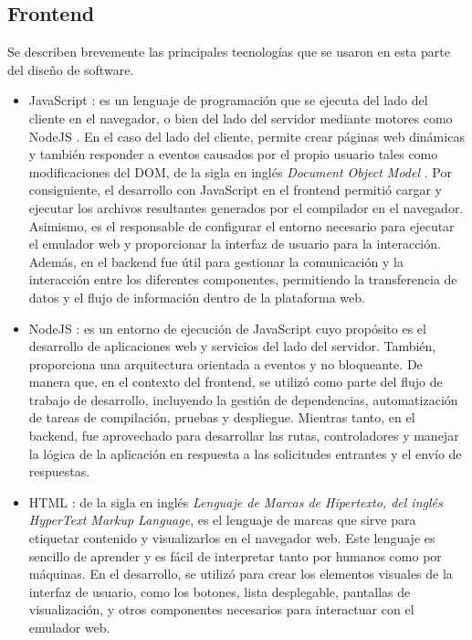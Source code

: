\hfill \break
\hfill \break
\hfill \break
\hfill \break

\subsection{Frontend}
\label{subsec:Frontend}

Se describen brevemente las principales tecnologías que se usaron en esta parte del diseño de software.

\begin{itemize}
	\item JavaScript \citep{JavaScript}: es un lenguaje de programación que se ejecuta del lado del cliente en el navegador, o bien del lado del servidor mediante motores como NodeJS \citep{NodeJS}. En el caso del lado del cliente, permite crear páginas web dinámicas y también responder a eventos causados por el propio usuario tales como modificaciones del DOM, de la sigla en inglés  \textit{Document Object Model} \citep{DOM}. Por consiguiente, el desarrollo con JavaScript en el frontend permitió cargar y ejecutar los archivos resultantes generados por el compilador en el navegador. Asimismo, es el responsable de configurar el entorno necesario para ejecutar el emulador web y proporcionar la interfaz de usuario para la interacción. Además, en el backend fue útil para gestionar la comunicación y la interacción entre los diferentes componentes, permitiendo la transferencia de datos y el flujo de información dentro de la plataforma web.

	\item NodeJS \citep{NodeJS}: 
es un entorno de ejecución de JavaScript cuyo propósito es el desarrollo de aplicaciones web y servicios del lado del servidor. También, proporciona una arquitectura orientada a eventos y no bloqueante. 
De manera que, en el contexto del frontend, se utilizó como parte del flujo de trabajo de desarrollo, incluyendo la gestión de dependencias, automatización de tareas de compilación, pruebas y despliegue. Mientras tanto, en el backend, fue aprovechado para desarrollar las rutas, controladores y manejar la lógica de la aplicación en respuesta a las solicitudes entrantes y el envío de respuestas.

	\item HTML \citep{HTML}: de la sigla en inglés \textit{Lenguaje de Marcas de Hipertexto, del inglés HyperText Markup Language}, es el lenguaje de marcas que sirve para etiquetar contenido y visualizarlos en el navegador web.
	Este lenguaje es sencillo de aprender y es fácil de interpre­tar tanto por humanos como por máquinas.  En el desarrollo, se utilizó para crear los elementos visuales de la interfaz de usuario, como los botones, lista desplegable, pantallas de visualización, y otros componentes necesarios para interactuar con el emulador web.


\end{itemize}
